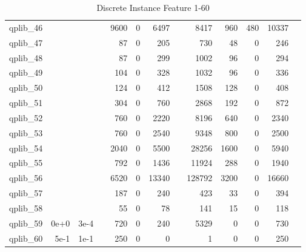 \begin{table}
\begin{tabular}{lrrrrrrrrrrrr}
qplib\_46	&		&		&	&	9600	&	0	&	6497	&	&	8417	&	960	&	480	&	10337	\\
qplib\_47	&		&		&	&	87	&	0	&	205	&	&	730	&	48	&	0	&	246	\\
qplib\_48	&		&		&	&	87	&	0	&	299	&	&	1002	&	96	&	0	&	294	\\
qplib\_49	&		&		&	&	104	&	0	&	328	&	&	1032	&	96	&	0	&	336	\\
qplib\_50	&		&		&	&	124	&	0	&	412	&	&	1508	&	128	&	0	&	408	\\
qplib\_51	&		&		&	&	304	&	0	&	760	&	&	2868	&	192	&	0	&	872	\\
qplib\_52	&		&		&	&	760	&	0	&	2220	&	&	8196	&	640	&	0	&	2340	\\
qplib\_53	&		&		&	&	760	&	0	&	2540	&	&	9348	&	800	&	0	&	2500	\\
qplib\_54	&		&		&	&	2040	&	0	&	5500	&	&	28256	&	1600	&	0	&	5940	\\
qplib\_55	&		&		&	&	792	&	0	&	1436	&	&	11924	&	288	&	0	&	1940	\\
qplib\_56	&		&		&	&	6520	&	0	&	13340	&	&	128792	&	3200	&	0	&	16660	\\
qplib\_57	&		&		&	&	187	&	0	&	240	&	&	423	&	33	&	0	&	394	\\
qplib\_58	&		&		&	&	55	&	0	&	78	&	&	141	&	15	&	0	&	118	\\
qplib\_59	&	0e+0	&	3e-4	&	&	720	&	0	&	240	&	&	5329	&	0	&	0	&	730	\\
qplib\_60	&	5e-1	&	1e-1	&	&	250	&	0	&	0	&	&	1	&	0	&	0	&	250	\\




\bottomrule

\end{tabular}  
\label{tab:A1}
\caption{Discrete Instance Feature 1-60} 

\end{table}

